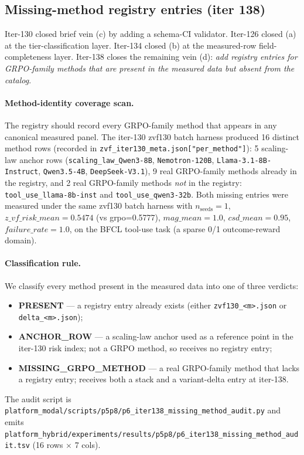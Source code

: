 \documentclass{article}
\begin{document}
\subsection{Missing-method registry entries (iter 138)}
\label{sec:p6-iter138-missing-method}

Iter-130 closed brief vein (c) by adding a schema-CI validator.
Iter-126 closed (a) at the tier-classification layer. Iter-134 closed
(b) at the measured-row field-completeness layer. Iter-138 closes the
remaining vein (d): \emph{add registry entries for GRPO-family methods
that are present in the measured data but absent from the catalog}.

\paragraph{Method-identity coverage scan.}
The registry should record every GRPO-family method that appears in
any canonical measured panel. The iter-130 zvf130 batch harness
produced 16 distinct method rows (recorded in
\texttt{zvf\_iter130\_meta.json["per\_method"]}): 5
scaling-law anchor rows (\texttt{scaling\_law\_Qwen3-8B},
\texttt{Nemotron-120B}, \texttt{Llama-3.1-8B-Instruct},
\texttt{Qwen3.5-4B}, \texttt{DeepSeek-V3.1}), 9 real GRPO-family
methods already in the registry, and 2 real GRPO-family methods
\emph{not} in the registry:
\texttt{tool\_use\_llama-8b-inst} and \texttt{tool\_use\_qwen3-32b}.
Both missing entries were measured under the same zvf130 batch harness
with $n_{\text{seeds}}=1$, $z\_vf\_risk\_mean = 0.5474$ (vs
grpo=0.5777), $\mathit{mag\_mean}=1.0$, $\mathit{csd\_mean}=0.95$,
$\mathit{failure\_rate}=1.0$, on the BFCL tool-use task (a sparse 0/1
outcome-reward domain).

\paragraph{Classification rule.}
We classify every method present in the measured data into one of three
verdicts:
\begin{itemize}
\item \textbf{PRESENT} --- a registry entry already exists (either
  \texttt{zvf130\_<m>.json} or \texttt{delta\_<m>.json});
\item \textbf{ANCHOR\_ROW} --- a scaling-law anchor used as a
  reference point in the iter-130 risk index; not a GRPO method, so
  receives no registry entry;
\item \textbf{MISSING\_GRPO\_METHOD} --- a real GRPO-family method
  that lacks a registry entry; receives both a stack and a
  variant-delta entry at iter-138.
\end{itemize}
The audit script is
\texttt{platform_modal/scripts/p5p8/p6\_iter138\_missing\_method\_audit.py} and
emits \texttt{platform_hybrid/experiments/results/p5p8/p6\_iter138\_missing\_method\_audit.tsv}
(16 rows $\times$ 7 cols).
\end{document}

